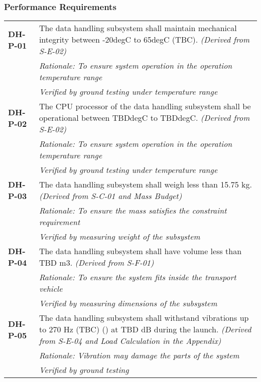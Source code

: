 \subsubsection*{Performance Requirements}
\vspace{-15pt}
\begin{longtable}{P{2cm}P{13.25cm}}
\textbf{DH-P-01}	&
The data handling subsystem shall maintain mechanical integrity between -20\gls{degC} to 65\gls{degC} (\gls{TBC}).
\textit{(Derived from S-E-02)}	\\
& \textit{Rationale: To ensure system operation in the operation temperature range} \\
& \textit{Verified by ground testing under temperature range}	\\	

\textbf{DH-P-02}	&
The CPU processor of the data handling subsystem shall be operational between \gls{TBD}\gls{degC} to \gls{TBD}\gls{degC}.
\textit{(Derived from S-E-02)}	\\
& \textit{Rationale: To ensure system operation in the operation temperature range} \\
& \textit{Verified by ground testing under temperature range}\\

\textbf{DH-P-03}	&
The data handling subsystem shall weigh less than 15.75 \gls{kg}.
\textit{(Derived from S-C-01 and Mass Budget)}	\\
& \textit{Rationale: To ensure the mass satisfies the constraint requirement} \\
& \textit{Verified by measuring weight of the subsystem}	\\

\textbf{DH-P-04}	&
The data handling subsystem shall have volume less than \gls{TBD} \gls{m3}.
\textit{(Derived from S-F-01)}	\\
& \textit{Rationale: To ensure the system fits inside the transport vehicle} \\
& \textit{Verified by measuring dimensions of the subsystem}	\\

\textbf{DH-P-05}	&
The data handling subsystem shall withstand vibrations up to 270 \gls{Hz} (\gls{TBC}) () at \gls{TBD} \gls{dB} during the launch.
\textit{(Derived from S-E-04 and Load Calculation in the Appendix)}	\\
& \textit{Rationale: Vibration may damage the parts of the system} \\
& \textit{Verified by ground testing}	\\


\end{longtable}
